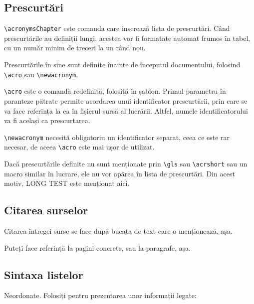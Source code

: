 \documentclass[a4paper,12pt]{report}
\begin{document}
\subsection{Prescurtări}

\verb|\acronymsChapter| este comanda care inserează lista de prescurtări.
Când prescurtările au definiții lungi, acestea vor fi formatate automat frumos în tabel,
cu un număr minim de treceri la un rând nou.

Prescurtările în sine sunt definite înainte de începutul documentului, folosind \verb|\acro| sau \verb|\newacronym|.

\verb|\acro| este o comandă redefinită, folosită în șablon.
Primul parametru în paranteze pătrate permite acordarea unui identificator prescurtării, prin care
se va face referința la ea în fișierul sursă al lucrării.
Altfel, numele identificatorului va fi același ca prescurtarea.

\verb|\newacronym| necesită obligatoriu un identificator separat, ceea ce este rar necesar,
de aceea \verb|\acro| este mai ușor de utilizat.

Dacă prescurtările definite nu sunt menționate prin
\verb|\gls| sau \verb|\acrshort| sau un macro similar în lucrare,
ele nu vor apărea în lista de prescurtări.
Din acest motiv, \acrshort{LONG TEST} este menționat aici.

\subsection{Citarea surselor}

Citarea întregei surse se face după bucata de text care o menționează, așa\cite{gif_unusable_reason}.

Puteți face referință la pagini concrete, sau la paragrafe, așa\cite[12.2.]{png_spec}.

\subsection{Sintaxa listelor}

Neordonate. Folosiți pentru prezentarea unor informații legate:
\end{document}
